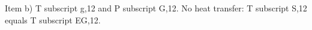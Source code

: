 Item b) T subscript g,12 and P subscript G,12. No heat transfer: T subscript S,12 equals T subscript EG,12.